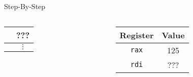 \documentclass[hyphens,aspectratio=169]{beamer}
\begin{document}
\begin{frame}[fragile]{Step-By-Step}
\begin{columns}
\begin{column}{0.33\textwidth}
{\begin{tabular}{c|c|}
                \hline
                & ??? \\
                \hline
                & $\vdots$
            \end{tabular}}
        \end{column}
        \begin{column}{0.33\textwidth}
            \begin{tabular}{| c | c |}
                \hline
                Register & Value \\
                \hline
                \texttt{rax} & 125 \\
                \hline
                \texttt{rdi} & ??? \\
                \hline
            \end{tabular}
        \end{column}
    \end{columns}
\end{frame}
\end{document}
